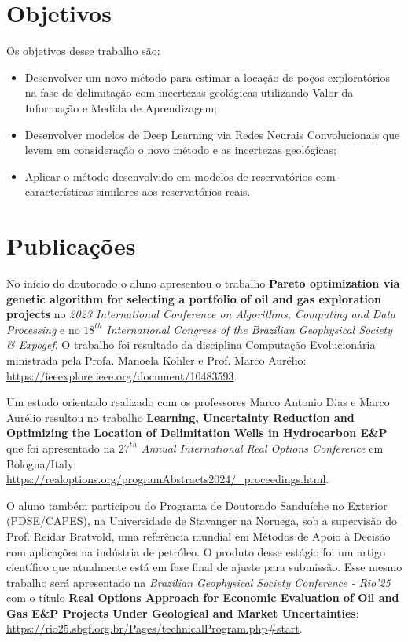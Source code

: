 \section{Objetivos}
Os objetivos desse trabalho são:
\begin{itemize}
    \item[\textbullet] Desenvolver um novo método para estimar a locação de poços exploratórios na fase de delimitação com incertezas geológicas utilizando Valor da Informação e Medida de Aprendizagem;
    \item[\textbullet] Desenvolver modelos de Deep Learning via Redes Neurais Convolucionais que levem em consideração o novo método e as incertezas geológicas;
    \item[\textbullet] Aplicar o método desenvolvido em modelos de reservatórios com características similares aos reservatórios reais.
\end{itemize}

\section{Publicações}
No início do doutorado o aluno apresentou o trabalho \textbf{Pareto optimization via genetic algorithm for selecting a portfolio of oil and gas exploration projects} no \textit{2023 International Conference on Algorithms, Computing and Data Processing} e no \textit{$18^{th}$ International Congress of the Brazilian Geophysical Society \& Expogef}. O trabalho foi resultado da disciplina Computação Evolucionária ministrada pela Profa. Manoela Kohler e Prof. Marco Aurélio: \url{https://ieeexplore.ieee.org/document/10483593}.

Um estudo orientado realizado com os professores Marco Antonio Dias e Marco Aurélio resultou no trabalho \textbf{Learning, Uncertainty Reduction and Optimizing the Location of Delimitation Wells in Hydrocarbon E\&P} que foi apresentado na \textit{$27^{th}$ Annual International Real Options Conference} em Bologna/Italy: \url{https://realoptions.org/programAbstracts2024/_proceedings.html}. 

O aluno também participou do Programa de Doutorado Sanduíche no Exterior (PDSE/CAPES), na Universidade de Stavanger na Noruega, sob a supervisão do Prof. Reidar Bratvold, uma referência mundial em Métodos de Apoio à Decisão com aplicações na indústria de petróleo. O produto desse estágio foi um artigo científico que atualmente está em fase final de ajuste para submissão. Esse mesmo trabalho será apresentado na \textit{Brazilian Geophysical Society Conference - Rio'25} com o título \textbf{Real Options Approach for Economic Evaluation of Oil and Gas E\&P Projects Under Geological and Market Uncertainties}: \url{https://rio25.sbgf.org.br/Pages/technicalProgram.php#start}.

